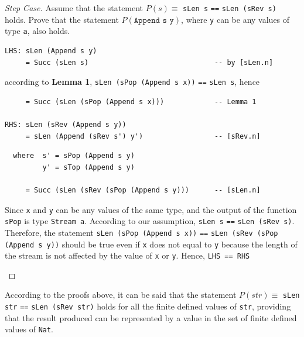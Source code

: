 \documentclass[12pt]{article}
\newcommand{\haskell}{\texttt}
\newenvironment{question}[2][Question]{\begin{trivlist}
\item[\hskip \labelsep {\bfseries #1}\hskip \labelsep {\bfseries #2.}]}{\end{trivlist}}
\begin{document}
\begin{proof}[Step Case]
Assume that the statement $P(s) \equiv$ \haskell{sLen s} \haskell{==} 
\haskell{sLen (sRev s)} holds. Prove that the statement $P(\haskell{Append s y})$, 
where \haskell{y} can be any values of type \haskell{a}, also holds.

\begin{mdframed}
\begin{verbatim}
LHS: sLen (Append s y) 
     = Succ (sLen s)                              -- by [sLen.n]
\end{verbatim}

according to \textbf{Lemma 1}, \haskell{sLen (sPop (Append s x))} 
\haskell{==} \haskell{sLen s}, hence
\begin{verbatim}
     = Succ (sLen (sPop (Append s x)))            -- Lemma 1
     
RHS: sLen (sRev (Append s y))
     = sLen (Append (sRev s') y')                 -- [sRev.n]
\end{verbatim}

\begin{verbatim}
  where  s' = sPop (Append s y)
         y' = sTop (Append s y)

     = Succ (sLen (sRev (sPop (Append s y)))      -- [sLen.n]
\end{verbatim}

Since \haskell{x} and \haskell{y} can be any values of the same type, and
the output of the function \haskell{sPop} is type \haskell{Stream a}. According
to our assumption, \haskell{sLen s} \haskell{==} \haskell{sLen (sRev s)}. Therefore, the statement \haskell{sLen (sPop (Append s x))} \haskell{==} 
\haskell{sLen (sRev (sPop (Append s y))} should be true even if \haskell{x} does not equal to \haskell{y} because the length of the stream is not affected by the value of 
\haskell{x} or \haskell{y}. Hence, \haskell{LHS == RHS}
\end{mdframed}
\end{proof}
According to the proofs above, it can be said that the statement $P(str) \equiv$ \haskell{sLen str} \haskell{==} \haskell{sLen (sRev str)} holds for all the finite defined values of
\haskell{str}, providing that the result produced can be represented by a value in the set of finite defined values of \haskell{Nat}.


\newpage\begin{question}{2}
\end{question}
\end{document}

